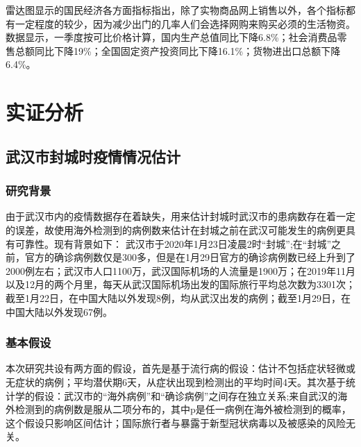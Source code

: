 \documentclass[12pt,hyperref,]{ctexart}
\begin{document}
雷达图显示的国民经济各方面指标指出，除了实物商品网上销售以外，各个指标都有一定程度的较少，因为减少出门的几率人们会选择网购来购买必须的生活物资。数据显示，一季度按可比价格计算，国内生产总值同比下降6.8\%；社会消费品零售总额同比下降19\%；全国固定资产投资同比下降16.1\%；货物进出口总额下降6.4\%。

\hypertarget{ux5b9eux8bc1ux5206ux6790}{%
\section{实证分析}\label{ux5b9eux8bc1ux5206ux6790}}

\hypertarget{ux6b66ux6c49ux5e02ux5c01ux57ceux65f6ux75abux60c5ux60c5ux51b5ux4f30ux8ba1}{%
\subsection{武汉市封城时疫情情况估计}\label{ux6b66ux6c49ux5e02ux5c01ux57ceux65f6ux75abux60c5ux60c5ux51b5ux4f30ux8ba1}}

\hypertarget{ux7814ux7a76ux80ccux666f}{%
\subsubsection{研究背景}\label{ux7814ux7a76ux80ccux666f}}

由于武汉市内的疫情数据存在着缺失，用来估计封城时武汉市的患病数存在着一定的误差，故使用海外检测到的病例数来估计在封城之前在武汉可能发生的病例更具有可靠性。现有背景如下：
武汉市于2020年1月23日凌晨2时``封城'';在``封城''之前，官方的确诊病例数仅是300多，但是在1月29日官方的确诊病例数已经上升到了2000例左右；武汉市人口1100万，武汉国际机场的人流量是1900万；在2019年11月以及12月的两个月里，每天从武汉国际机场出发的国际旅行平均总次数为3301次；截至1月22日，在中国大陆以外发现8例，均从武汉出发的病例；截至1月29日，在中国大陆以外发现67例。

\hypertarget{ux57faux672cux5047ux8bbe}{%
\subsubsection{基本假设}\label{ux57faux672cux5047ux8bbe}}

本次研究共设有两方面的假设，首先是基于流行病的假设：估计不包括症状轻微或无症状的病例；平均潜伏期6天，从症状出现到检测出的平均时间4天。其次基于统计学的假设：武汉市的``海外病例''和``确诊病例''之间存在独立关系;来自武汉的海外检测到的病例数是服从二项分布的，其中p是任一病例在海外被检测到的概率，这个假设只影响区间估计；国际旅行者与暴露于新型冠状病毒以及被感染的风险无关。
\end{document}
